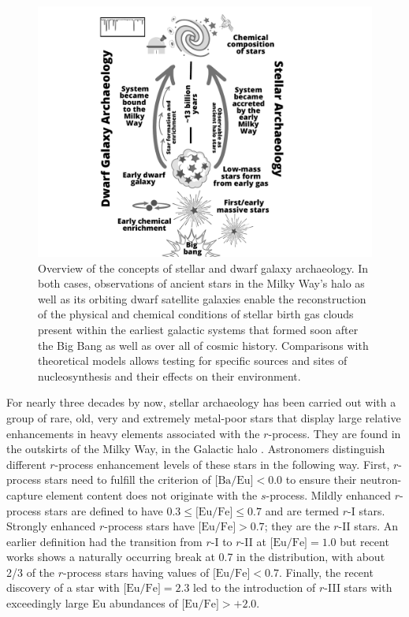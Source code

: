 \documentclass[letterpaper]{article}
\begin{document}
\begin{figure}[!b]
\centering
    \includegraphics[width=0.8\linewidth]{figures/stellar_archaeology_final.pdf}
    \caption{Overview of the concepts of stellar and dwarf galaxy archaeology. In both cases, observations of ancient stars in the Milky Way's halo as well as its orbiting dwarf satellite galaxies enable the reconstruction of the physical and chemical conditions of stellar birth gas clouds present within the earliest galactic systems that formed soon after the Big Bang as well as over all of cosmic history. Comparisons with theoretical models allows testing for specific sources and sites of nucleosynthesis and their effects on their environment.
    }
    \label{fig:overview}
\end{figure}


For nearly three decades by now, stellar archaeology has been carried out with a group of rare, old, very and extremely metal-poor stars that display large relative enhancements in heavy elements associated with the $r$-process. They are found in the outskirts of the Milky Way, in the Galactic halo \citep{Beers05, Sneden2008, Frebel2018}. 
Astronomers distinguish different $r$-process enhancement levels of these stars in the following way. First, $r$-process stars need to fulfill the criterion of $\mbox{[Ba/Eu]} < 0.0$ to ensure their neutron-capture element content does not originate with the $s$-process. Mildly enhanced $r$-process stars are defined to have $0.3 \le \mbox{[Eu/Fe]} \le 0.7$ and are termed $r$-I stars. Strongly enhanced $r$-process stars have $\mbox{[Eu/Fe]} > 0.7$; they are the $r$-II stars. An earlier definition had the transition from $r$-I to $r$-II at $\mbox{[Eu/Fe]} =1.0$ but recent works shows a naturally occurring break at 0.7 in the distribution, with about 2/3 of the $r$-process stars having values of $\mbox{[Eu/Fe]}<0.7$. Finally, the recent discovery of a star with $\mbox{[Eu/Fe]} = 2.3$ \citep{cain20} led to the introduction of $r$-III stars with exceedingly large Eu abundances of $\mbox{[Eu/Fe]} > +2.0$. 
\end{document}
